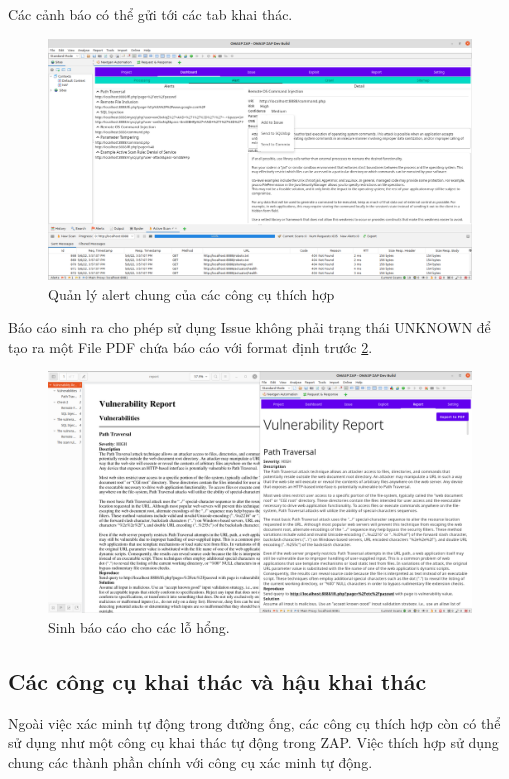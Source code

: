 \documentclass[./../main.tex]{subfiles}
\begin{document}
Các cảnh báo có thể gửi tới các tab khai thác.

\begin{figure}[h!]
	\includegraphics[width=\linewidth]{./images/alert.png}
	\caption{Quản lý alert chung của các công cụ thích hợp}
	\label{fig:alert}
\end{figure}

Báo cáo sinh ra cho phép sử dụng Issue không phải trạng thái
UNKNOWN để tạo ra một File PDF chứa báo cáo với format định trước \ref{fig:report}.

\begin{figure}[h!]
	\includegraphics[width=\linewidth]{./images/report.png}
	\caption{Sinh báo cáo cho các lỗ hổng.}
	\label{fig:report}
\end{figure}

\subsection{Các công cụ khai thác và hậu khai thác}

Ngoài việc xác minh tự động trong đường ống, các công cụ thích
hợp còn có thể sử dụng như một công cụ khai thác tự động trong ZAP.
Việc thích hợp sử dụng chung các thành phần chính với công cụ xác minh
tự động.
\end{document}
